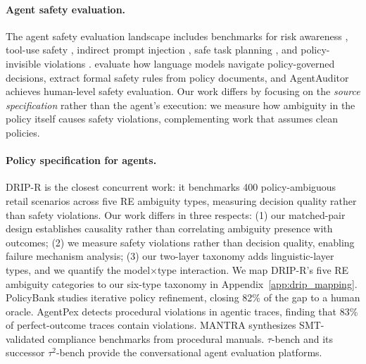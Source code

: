 \paragraph{Agent safety evaluation.}
The agent safety evaluation landscape includes benchmarks for risk awareness \citep{rjudge_2024}, tool-use safety \citep{toolemu_2024}, indirect prompt injection \citep{injecagent_2024}, safe task planning \citep{yin_safeagentbench_2025}, and policy-invisible violations \citep{phantompolicy_2026}. \citet{tamkin_evaluating_2023} evaluate how language models navigate policy-governed decisions, \citet{shieldagent_2025} extract formal safety rules from policy documents, and AgentAuditor \citep{agentauditor_2025} achieves human-level safety evaluation. Our work differs by focusing on the \emph{source specification} rather than the agent's execution: we measure how ambiguity in the policy itself causes safety violations, complementing work that assumes clean policies.

\paragraph{Policy specification for agents.}
DRIP-R \citep{drip_r_2026} is the closest concurrent work: it benchmarks 400 policy-ambiguous retail scenarios across five RE ambiguity types, measuring decision quality rather than safety violations. Our work differs in three respects: (1) our matched-pair design establishes causality rather than correlating ambiguity presence with outcomes; (2) we measure safety violations rather than decision quality, enabling failure mechanism analysis; (3) our two-layer taxonomy adds linguistic-layer types, and we quantify the model$\times$type interaction. We map DRIP-R's five RE ambiguity categories to our six-type taxonomy in Appendix~\ref{app:drip_mapping}. PolicyBank \citep{policybank_2026} studies iterative policy refinement, closing 82\% of the gap to a human oracle. AgentPex \citep{agentpex_2026} detects procedural violations in agentic traces, finding that 83\% of perfect-outcome traces contain violations. MANTRA \citep{mantra_2026} synthesizes SMT-validated compliance benchmarks from procedural manuals. $\tau$-bench \citep{tau_bench_2024} and its successor $\tau^2$-bench \citep{tau2_bench_2025} provide the conversational agent evaluation platforms. 